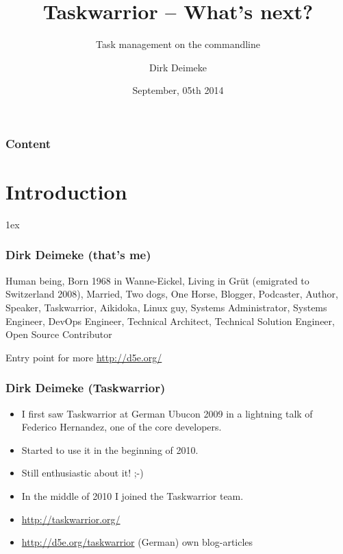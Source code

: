 \documentclass[t,handout]{beamer}
\title{Taskwarrior -- What's next?}
\subtitle{Task management on the commandline}
\author[Deimeke, Dirk]{Dirk Deimeke}
\institute[Swiss Perl Workshop 2014]{Swiss Perl Workshop 2014}
\date{September, 05th 2014}
\begin{document}
\begin{frame} %
	\titlepage
\end{frame}


\begin{frame}\frametitle{Content}
	\tableofcontents
\end{frame}

\section{Introduction} 

\parskip1ex

\begin{frame}\frametitle{Dirk Deimeke (that's me)}
	Human being, Born 1968 in Wanne-Eickel, Living in Grüt (emigrated to Switzerland 2008), Married, Two dogs, One Horse, Blogger, Podcaster, Author, Speaker, Taskwarrior, Aikidoka, Linux guy, Systems Administrator, Systems Engineer, DevOps Engineer, Technical Architect, Technical Solution Engineer, Open Source Contributor

	Entry point for more \url{http://d5e.org/}
\end{frame}

\begin{frame}\frametitle{Dirk Deimeke (Taskwarrior)}
\begin{itemize}
	\item I first saw Taskwarrior at German Ubucon 2009 in a lightning talk of Federico Hernandez, one of the core developers. \pause
	\item Started to use it in the beginning of 2010. \pause
	\item Still enthusiastic about it! ;-) \pause
	\item In the middle of 2010 I joined the Taskwarrior team.
	\item \url{http://taskwarrior.org/}
	\item \url{http://d5e.org/taskwarrior} (German) own blog-articles
\end{itemize}
\end{frame}
\end{document}

